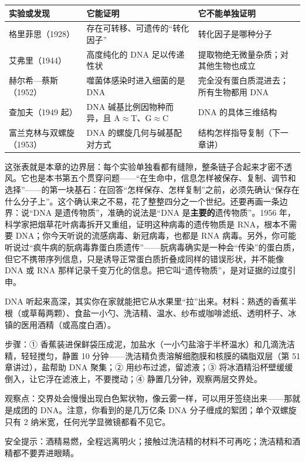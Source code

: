 \begin{table}[htbp]
\centering
\small
\begin{tabular}{p{3.0cm}p{4.8cm}p{4.8cm}}
\toprule
实验或发现 & 它能证明 & 它不能单独证明 \\
\midrule
格里菲思（1928） & 存在可转移、可遗传的“转化因子” & 转化因子是哪种分子 \\
艾弗里（1944） & 高度纯化的 DNA 足以传递性状 & 提取物绝无微量杂质；对其他生物也成立 \\
赫尔希—蔡斯（1952） & 噬菌体感染时进入细菌的是 DNA & 完全没有蛋白质混进去；所有生物都用 DNA \\
查加夫（1949 起） & DNA 碱基比例因物种而异，且 A$\approx$T、G$\approx$C & DNA 的具体三维结构 \\
富兰克林与双螺旋（1953） & DNA 的螺旋几何与碱基配对方式 & 结构怎样指导复制（下一章讲） \\
\bottomrule
\end{tabular}
\end{table}

这张表就是本章的边界层：每个实验单独看都有缝隙，整条链子合起来才密不透风。它也是本书第五个贯穿问题——“在生命中，信息怎样被保存、复制、调节和选择”——的第一块基石：在回答“怎样保存、怎样复制”之前，必须先确认“保存在什么分子上”。这个确认来之不易，花了整整四分之一个世纪。还要再画一条边界：说“DNA 是遗传物质”，准确的说法是“DNA 是\textbf{主要的}遗传物质”。1956 年，科学家把烟草花叶病毒拆开又重组，证明这种病毒的遗传物质是 RNA，根本不需要 DNA；你今天听说的流感病毒、新冠病毒，也都是 RNA 病毒。另外，你可能听说过“疯牛病的朊病毒靠蛋白质遗传”——朊病毒确实是一种会“传染”的蛋白质，但它不携带序列信息，只是诱导正常蛋白质折叠成同样的错误形状，并不能像 DNA 或 RNA 那样记录千变万化的信息。把它叫“遗传物质”，是对证据的过度引申。

\begin{shiyan}
DNA 听起来高深，其实你在家就能把它从水果里“拉”出来。材料：熟透的香蕉半根（或草莓两颗）、食盐一小勺、洗洁精、温水、纱布或咖啡滤纸、透明杯子、冰镇的医用酒精（或高度白酒）。

步骤：① 香蕉装进保鲜袋压成泥，加盐水（一小勺盐溶于半杯温水）和几滴洗洁精，轻轻搅匀，静置 10 分钟——洗洁精负责溶解细胞膜和核膜的磷脂双层（第 51 章讲过），盐帮助 DNA 聚集；② 用纱布过滤，留滤液；③ 将冰酒精沿杯壁缓缓倒入，让它浮在滤液上，不要搅动；④ 静置几分钟，观察两层交界处。

观察点：交界处会慢慢出现白色絮状物，像云雾一样，可以用牙签绕出来——那就是成团的 DNA。注意，你看到的是几万亿条 DNA 分子缠成的絮团；单个双螺旋只有 2 纳米宽，任何光学显微镜都看不见它。

安全提示：酒精易燃，全程远离明火；接触过洗洁精的材料不可再吃；洗洁精和酒精都不要弄进眼睛。
\end{shiyan}

